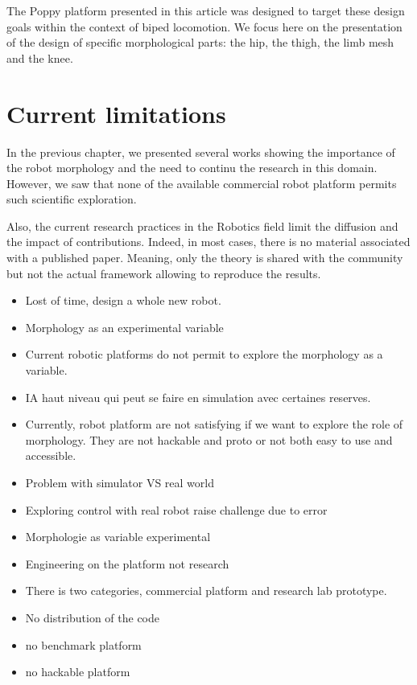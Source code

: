 The Poppy platform presented in this article was designed to target these design goals within the context of biped locomotion. We focus here on the presentation of the design of specific morphological parts: the hip, the thigh, the limb mesh and the knee.

\section{Current limitations}

In the previous chapter, we presented several works showing the importance of the robot morphology and the need to continu the research in this domain. However, we saw that none of the available commercial robot platform permits such scientific exploration.

Also, the current research practices in the Robotics field limit the diffusion and the impact of contributions. Indeed, in most cases, there is no material associated with a published paper. Meaning, only the theory is shared with the community but not the actual framework allowing to reproduce the results.

\begin{itemize}
    \item Lost of time, design a whole new robot.
    \item Morphology as an experimental variable
    \item Current robotic platforms do not permit to explore the morphology as a variable.
    \item IA haut niveau qui peut se faire en simulation avec certaines reserves.
    \item Currently, robot platform are not satisfying if we want to explore the role of morphology. They are not hackable and proto or not both easy to use and accessible.
    \item Problem with simulator VS real world
    \item Exploring control with real robot raise challenge due to error
    \item Morphologie as variable experimental
    \item Engineering on the platform not research
    \item There is two categories, commercial platform and research lab prototype.
    \item No distribution of the code
    \item no benchmark platform
    \item no hackable platform
\end{itemize}

